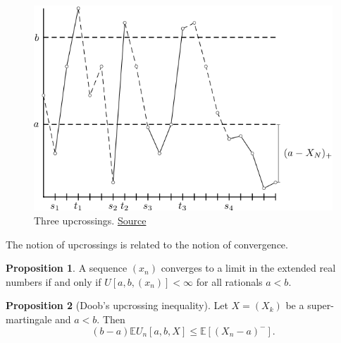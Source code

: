 \documentclass[parskip=full]{article}
\theoremstyle{definition}
\newtheorem{proposition}{Proposition}[section]
\newcommand{\1}{\mathbbm{1}}
\newcommand{\E}{\mathbb{E}}
\begin{document}
\begin{figure}[h]
  \centering
  \includegraphics*{upcrossings.png}
  \caption{Three upcrossings. \href{https://almostsuremath.com/2009/12/06/upcrossings-downcrossings-and-martingale-convergence/}{Source}}
\end{figure}

The notion of upcrossings is related to the notion of convergence.

\begin{proposition}
  A sequence $(x_n)$ converges to a limit in the extended real numbers if and only if $U[a, b, (x_n)] < \infty$ for all rationals $a < b$.
\end{proposition}

\begin{proposition}[Doob's upcrossing inequality]
  Let $X=(X_k)$ be a super-martingale and $a < b$. Then
  \[
    (b - a) \E U_n[a, b, X] \leq \E[(X_n - a)^-].
  \]
\end{proposition}
\end{document}
